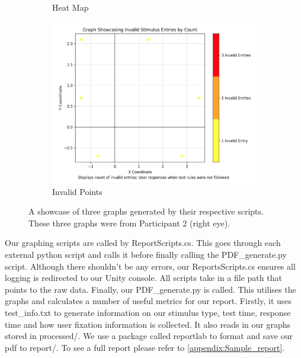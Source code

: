 \documentclass{l4proj}
\begin{document}
\begin{figure}[htbp]
\begin{subfigure}[b]{0.4\textwidth}
        \caption{Heat Map}
        \label{fig:implemented_hm}
    \end{subfigure}
    \hfill
    \begin{subfigure}[b]{0.5\textwidth}
        \includegraphics[width=\textwidth]{dissertation/images/participant2_iv_r.png}
        \caption{Invalid Points}
        \label{fig:implemented_iv}
    \end{subfigure}
    \caption{A showcase of three graphs generated by their respective scripts. These three graphs were from Participant 2 (right eye).}
    \label{fig:implemented_graphs}
\end{figure}
Our graphing scripts are called by ReportScripts.cs. This goes through each external python script and calls it before finally calling the PDF\_generate.py script. Although there shouldn't be any errors, our ReportsScripts.cs ensures all logging is redirected to our Unity console. All scripts take in a file path that points to the raw data. Finally, our PDF\_generate.py is called. This utilises the graphs and calculates a number of useful metrics for our report. Firstly, it uses test\_info.txt to generate information on our stimulus type, test time, response time and how user fixation information is collected. It also reads in our graphs stored in processed/. We use a package called reportlab to format and save our pdf to report/. To see a full report please refer to \ref{appendix:Sample_report}.
\end{document}
